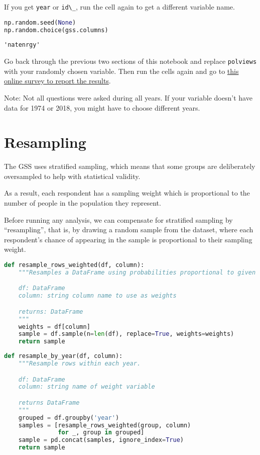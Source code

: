 If you get \passthrough{\lstinline!year!} or
\passthrough{\lstinline!id\_!}, run the cell again to get a different
variable name.

\begin{lstlisting}[language=Python,style=source]
np.random.seed(None)
np.random.choice(gss.columns)
\end{lstlisting}

\begin{lstlisting}[style=output]
'natenrgy'
\end{lstlisting}

Go back through the previous two sections of this notebook and replace
\passthrough{\lstinline!polviews!} with your randomly chosen variable.
Then run the cells again and go to
\href{https://forms.gle/tmST8YCu4qLc414F7}{this online survey to report
the results}.

Note: Not all questions were asked during all years. If your variable
doesn't have data for 1974 or 2018, you might have to choose different
years.

\hypertarget{resampling}{%
\section{Resampling}\label{resampling}}

The GSS uses stratified sampling, which means that some groups are
deliberately oversampled to help with statistical validity.

As a result, each respondent has a sampling weight which is proportional
to the number of people in the population they represent.

Before running any analysis, we can compensate for stratified sampling
by ``resampling'', that is, by drawing a random sample from the dataset,
where each respondent's chance of appearing in the sample is
proportional to their sampling weight.

\begin{lstlisting}[language=Python,style=source]
def resample_rows_weighted(df, column):
    """Resamples a DataFrame using probabilities proportional to given column.

    df: DataFrame
    column: string column name to use as weights

    returns: DataFrame
    """
    weights = df[column]
    sample = df.sample(n=len(df), replace=True, weights=weights)
    return sample
\end{lstlisting}

\begin{lstlisting}[language=Python,style=source]
def resample_by_year(df, column):
    """Resample rows within each year.

    df: DataFrame
    column: string name of weight variable

    returns DataFrame
    """
    grouped = df.groupby('year')
    samples = [resample_rows_weighted(group, column)
               for _, group in grouped]
    sample = pd.concat(samples, ignore_index=True)
    return sample
\end{lstlisting}

